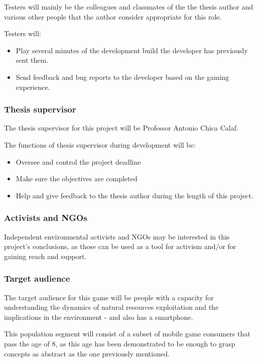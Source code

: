 Testers will mainly be the colleagues and classmates of the the thesis author and various other people that the author consider appropriate for this role.

Testers will:

\begin{itemize}
\item Play several minutes of the development build the developer has previously sent them.
\item Send feedback and bug reports to the developer based on the gaming experience. 
\end{itemize}

\subsubsection{Thesis supervisor}

The thesis supervisor for this project will be Professor Antonio Chica Calaf.

The functions of thesis supervisor during development will be:

\begin{itemize}
\item Oversee and control the project deadline
\item Make sure the objectives are completed
\item Help and give feedback to the thesis author during the length of this project.
\end{itemize}

\subsubsection{Activists and \glspl{NGO}}

Independent environmental activists and \glspl{NGO} may be interested in this project's conclusions, as those can be used as a tool for activism and/or for gaining reach and support. 

\subsubsection{Target audience}

The target audience for this game will be people with a capacity for understanding the dynamics of natural resources exploitation and the implications in the environment - and also has a smartphone.

This population segment will consist of a subset of mobile game consumers that pass the age of 8, as this age has been demonstrated
\cite{childdevelopment}
to be enough to grasp concepts as abstract as the one previously mentioned.

